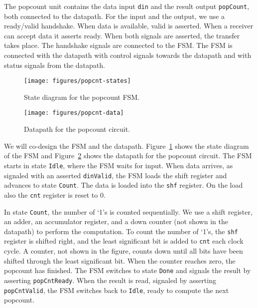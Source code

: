 \documentclass[%
    10pt,
    headinclude, footexclude,
    openright, %
    notitlepage,
    cleardoubleempty,
    headsepline,
    pointlessnumbers,
    bibtotoc, idxtotoc,
    ]{scrbook}
\newcommand{\scale}{0.7}
\newcommand{\code}[1]{{\lstinline[basicstyle=\small\ttfamily]{#1}}}
\begin{document}
The popcount unit contains the data input \code{din} and the result output \code{popCount},
both connected to the datapath. For the input and the output, we use a ready/valid handshake.
When data is available, valid is asserted. When a receiver can accept data it asserts ready.
When both signals are asserted, the transfer takes place. The handshake signals are connected
to the FSM. The FSM is connected with the datapath with control signals towards the datapath
and with status signals from the datapath.

\begin{figure}
  \centering
  \texttt{[image: figures/popcnt-states]}
  \caption{State diagram for the popcount FSM.}
  \label{fig:popcnt-states}
\end{figure}

\begin{figure}
  \centering
  \texttt{[image: figures/popcnt-data]}
  \caption{Datapath for the popcount circuit.}
  \label{fig:popcnt-data}
\end{figure}

We will co-design the FSM and the datapath.
Figure~\ref{fig:popcnt-states} shows the state diagram of the FSM and
Figure~\ref{fig:popcnt-data} shows the datapath for the popcount circuit.
The FSM starts in state \code{Idle}, where the FSM waits for input.
When data arrives, as signaled with an asserted \code{dinValid}, the FSM loads the shift register
and advances to state \code{Count}.
The data is loaded into the \code{shf} register. On the load also the \code{cnt}
register is reset to 0.


In state \code{Count}, the number of `1's is counted sequentially.
We use a shift register, an adder, an accumulator
register, and a down counter (not shown in the datapath) to perform the computation.
To count the number of `1's, the \code{shf} register is shifted
right, and the least significant bit is added to \code{cnt} each clock cycle.
A counter, not shown in the figure, counts down until all bits have been shifted
through the least significant bit.
When the counter reaches zero, the popcount
has finished. The FSM switches to state \code{Done} and signals the result
by asserting \code{popCntReady}. When the result is read, signaled by asserting
\code{popCntValid}, the FSM switches back to \code{Idle},
ready to compute the next popcount.

\end{document}
